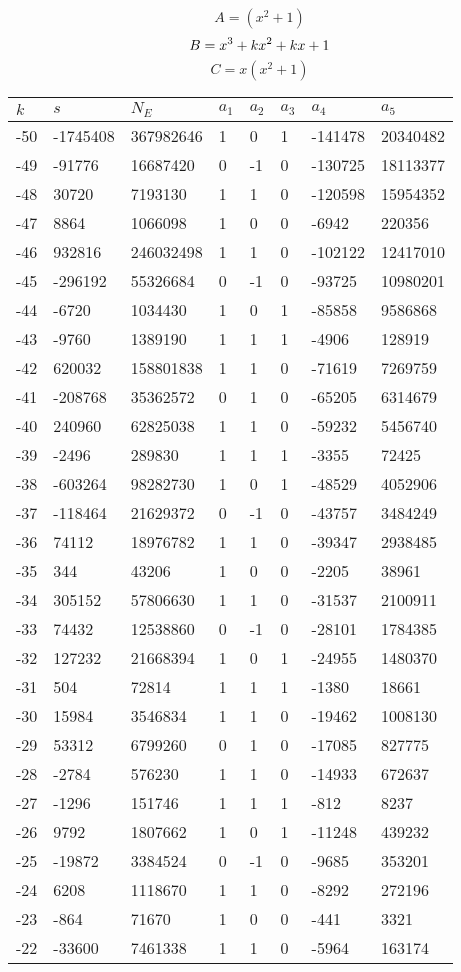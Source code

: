 \documentclass{amsart}
\begin{document}
$$A=(x^2
 + 1)$$
$$B=x^3
 + k\*x^2
 + k\*x
 + 1$$
$$C=x(x^2
 + 1)$$
\begin{longtable}{|l|l|l|lllll|}
\hline
$k$ & $s$ & $N_E$ & $a_1$ & $a_2$ & $a_3$ & $a_4$ & $a_5$\\
\hline
-50&-1745408&367982646&1&0&1&-141478&20340482\\
-49&-91776&16687420&0&-1&0&-130725&18113377\\
-48&30720&7193130&1&1&0&-120598&15954352\\
-47&8864&1066098&1&0&0&-6942&220356\\
-46&932816&246032498&1&1&0&-102122&12417010\\
-45&-296192&55326684&0&-1&0&-93725&10980201\\
-44&-6720&1034430&1&0&1&-85858&9586868\\
-43&-9760&1389190&1&1&1&-4906&128919\\
-42&620032&158801838&1&1&0&-71619&7269759\\
-41&-208768&35362572&0&1&0&-65205&6314679\\
-40&240960&62825038&1&1&0&-59232&5456740\\
-39&-2496&289830&1&1&1&-3355&72425\\
-38&-603264&98282730&1&0&1&-48529&4052906\\
-37&-118464&21629372&0&-1&0&-43757&3484249\\
-36&74112&18976782&1&1&0&-39347&2938485\\
-35&344&43206&1&0&0&-2205&38961\\
-34&305152&57806630&1&1&0&-31537&2100911\\
-33&74432&12538860&0&-1&0&-28101&1784385\\
-32&127232&21668394&1&0&1&-24955&1480370\\
-31&504&72814&1&1&1&-1380&18661\\
-30&15984&3546834&1&1&0&-19462&1008130\\
-29&53312&6799260&0&1&0&-17085&827775\\
-28&-2784&576230&1&1&0&-14933&672637\\
-27&-1296&151746&1&1&1&-812&8237\\
-26&9792&1807662&1&0&1&-11248&439232\\
-25&-19872&3384524&0&-1&0&-9685&353201\\
-24&6208&1118670&1&1&0&-8292&272196\\
-23&-864&71670&1&0&0&-441&3321\\
-22&-33600&7461338&1&1&0&-5964&163174\\

\end{longtable}
\end{document}
